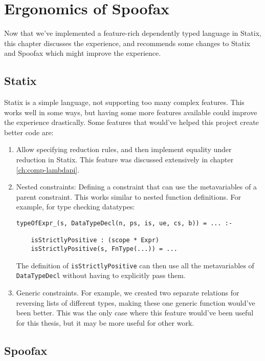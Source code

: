 \chapter{Ergonomics of Spoofax}
\label{ch:ergonomics}

Now that we've implemented a feature-rich dependently typed language in Statix, this chapter discusses the experience, and recommends some changes to Statix and Spoofax which might improve the experience. 

\section{Statix}

Statix is a simple language, not supporting too many complex features. This works well in some ways, but having some more features available could improve the experience drastically. Some features that would've helped this project create better code are:

\begin{enumerate}
	\item Allow specifying reduction rules, and then implement equality under reduction in Statix. This feature was discussed extensively in chapter \ref{ch:comp-lambdapi}.
	
	\item Nested constraints: Defining a constraint that can use the metavariables of a parent constraint. This works similar to nested function definitions. For example, for type checking datatypes:
	\begin{lstlisting}
typeOfExpr_(s, DataTypeDecl(n, ps, is, ue, cs, b)) = ... :-

	isStrictlyPositive : (scope * Expr)
	isStrictlyPositive(s, FnType(...)) = ...
	\end{lstlisting}
	The definition of \texttt{isStrictlyPositive} can then use all the metavariables of \\ \texttt{DataTypeDecl} without having to explicitly pass them.
	
	\item Generic constraints. For example, we created two separate relations for reversing lists of different types, making these one generic function would've been better. This was the only case where this feature would've been useful for this thesis, but it may be more useful for other work.
\end{enumerate}

\section{Spoofax}

